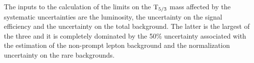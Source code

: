 The inputs to the calculation of the limits on the $\mathrm{T}_{5/3}$ mass affected by the systematic uncertainties are the luminosity, the uncertainty on the signal efficiency 
and the uncertainty on the total background. The latter is the largest of
the three and it is completely dominated by the 50\% uncertainty associated with the estimation of the 
non-prompt lepton background and the normalization uncertainty on the rare backgrounds.


